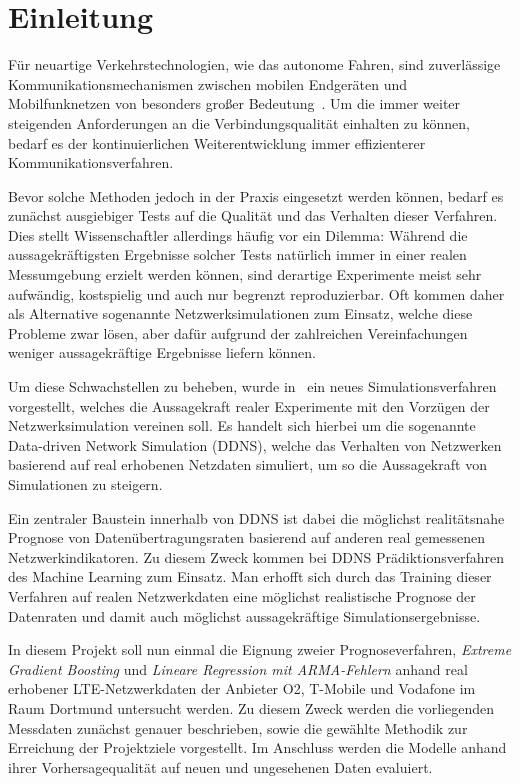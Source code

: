 \section{Einleitung}

F\"ur neuartige Verkehrstechnologien, wie das autonome Fahren, sind zuverl\"assige Kommunikationsmechanismen
zwischen mobilen Endger\"aten und Mobilfunknetzen von besonders gro{\ss}er Bedeutung~\cite{IEEE}.
Um die immer weiter steigenden Anforderungen an die Verbindungsqualit\"at einhalten zu k\"onnen, bedarf es
der kontinuierlichen Weiterentwicklung immer effizienterer Kommunikationsverfahren.

Bevor solche Methoden jedoch in der Praxis eingesetzt werden k\"onnen, bedarf es zun\"achst ausgiebiger Tests auf die Qualit\"at und
das Verhalten dieser Verfahren.
Dies stellt Wissenschaftler allerdings h\"aufig vor ein Dilemma: W\"ahrend die aussagekr\"aftigsten Ergebnisse solcher Tests nat\"urlich
immer in einer realen Messumgebung erzielt werden k\"onnen, sind derartige Experimente meist sehr aufw\"andig, kostspielig und
auch nur begrenzt reproduzierbar.
Oft kommen daher als Alternative sogenannte Netzwerksimulationen zum Einsatz, welche diese Probleme zwar l\"osen, aber daf\"ur
aufgrund der zahlreichen Vereinfachungen weniger aussagekr\"aftige Ergebnisse liefern k\"onnen.

Um diese Schwachstellen zu beheben, wurde in~\cite{IEEE} ein neues Simulationsverfahren vorgestellt,
welches die Aussagekraft realer Experimente
mit den Vorz\"ugen der Netzwerksimulation vereinen soll. Es handelt sich hierbei um die sogenannte Data-driven Network Simulation (DDNS),
welche das Verhalten von Netzwerken basierend auf real erhobenen Netzdaten simuliert, um so die Aussagekraft von Simulationen zu steigern.

Ein zentraler Baustein innerhalb von DDNS ist dabei die m\"oglichst realit\"atsnahe Prognose von Daten\"ubertragungsraten basierend
auf anderen real gemessenen Netzwerkindikatoren.
Zu diesem Zweck kommen bei DDNS Pr\"adiktionsverfahren des Machine Learning zum Einsatz.
Man erhofft sich durch das Training dieser Verfahren auf realen Netzwerkdaten eine m\"oglichst realistische Prognose der Datenraten und
damit auch m\"oglichst aussagekr\"aftige Simulationsergebnisse.

In diesem Projekt soll nun einmal die Eignung zweier Prognoseverfahren, \textit{Extreme Gradient Boosting} und
\textit{Lineare Regression mit ARMA-Fehlern} anhand real erhobener LTE-Netzwerkdaten der Anbieter O2, T-Mobile und Vodafone
im Raum Dortmund untersucht werden.
Zu diesem Zweck werden die vorliegenden Messdaten zun\"achst genauer beschrieben, sowie die gew\"ahlte Methodik zur Erreichung der
Projektziele vorgestellt. Im Anschluss werden die Modelle anhand ihrer Vorhersagequalit\"at auf neuen und ungesehenen Daten evaluiert.
